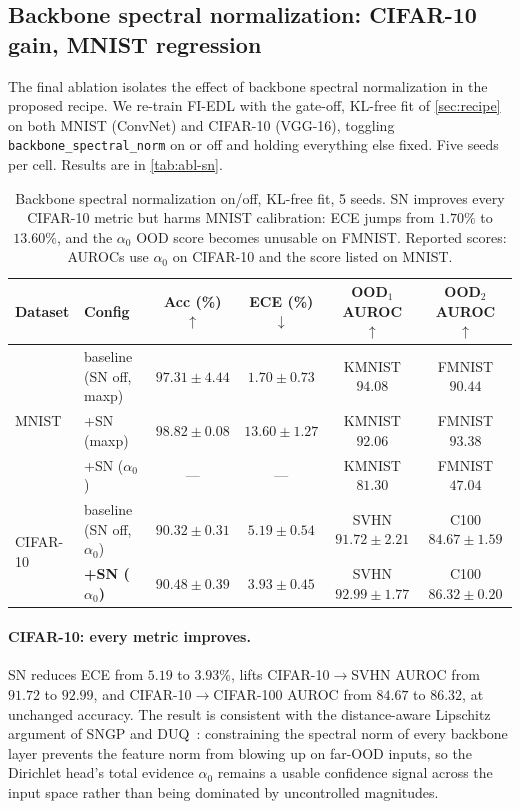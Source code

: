 \documentclass[review,5p,times]{elsarticle}
\begin{document}
\subsection{Backbone spectral normalization: CIFAR-10 gain, MNIST
regression}\label{sec:abl-sn}

The final ablation isolates the effect of backbone spectral normalization
in the proposed recipe. We re-train FI-EDL with the gate-off, KL-free fit
of \autoref{sec:recipe} on both MNIST (ConvNet) and CIFAR-10 (VGG-16),
toggling \texttt{backbone\_spectral\_norm} on or off and holding everything
else fixed. Five seeds per cell. Results are in
\autoref{tab:abl-sn}.

\begin{table}[t]
  \centering
  \caption{Backbone spectral normalization on/off, KL-free fit, 5 seeds.
    SN improves every CIFAR-10 metric but harms MNIST calibration:
    ECE jumps from $1.70\%$ to $13.60\%$, and the $\alpha_0$ OOD score
    becomes unusable on FMNIST. Reported scores: AUROCs use $\alpha_0$ on
    CIFAR-10 and the score listed on MNIST.}
  \label{tab:abl-sn}
  \small
  \begin{tabular}{llcccc}
    \toprule
    Dataset & Config & Acc (\%) $\uparrow$ & ECE (\%) $\downarrow$
      & OOD$_1$ AUROC $\uparrow$ & OOD$_2$ AUROC $\uparrow$ \\
    \midrule
    \multirow{3}{*}{MNIST}
      & baseline (SN off, maxp) & $97.31\!\pm\!4.44$
        & $\mathbf{1.70\!\pm\!0.73}$
        & KMNIST $\mathbf{94.08}$ & FMNIST $\mathbf{90.44}$ \\
      & +SN (maxp)              & $\mathbf{98.82\!\pm\!0.08}$
        & $13.60\!\pm\!1.27$
        & KMNIST $92.06$ & FMNIST $\mathbf{93.38}$ \\
      & +SN ($\alpha_0$)        & --- & --- & KMNIST $81.30$ &
        FMNIST $47.04$ \\
    \midrule
    \multirow{2}{*}{CIFAR-10}
      & baseline (SN off, $\alpha_0$) & $90.32\!\pm\!0.31$
        & $5.19\!\pm\!0.54$ & SVHN $91.72\!\pm\!2.21$
        & C100 $84.67\!\pm\!1.59$ \\
      & \textbf{+SN ($\alpha_0$)}     & $\mathbf{90.48\!\pm\!0.39}$
        & $\mathbf{3.93\!\pm\!0.45}$
        & SVHN $\mathbf{92.99\!\pm\!1.77}$
        & C100 $\mathbf{86.32\!\pm\!0.20}$ \\
    \bottomrule
  \end{tabular}
\end{table}

\paragraph{CIFAR-10: every metric improves.} SN reduces ECE from
$5.19$ to $3.93\%$, lifts CIFAR-10$\to$SVHN AUROC from $91.72$ to $92.99$,
and CIFAR-10$\to$CIFAR-100 AUROC from $84.67$ to $86.32$, at unchanged
accuracy. The result is consistent with the distance-aware Lipschitz
argument of SNGP and DUQ~\citep{liu2020sngp,vanamersfoort2020duq}:
constraining the spectral norm of every backbone layer prevents the
feature norm from blowing up on far-OOD inputs, so the Dirichlet head's
total evidence $\alpha_0$ remains a usable confidence signal across the
input space rather than being dominated by uncontrolled magnitudes.
\end{document}
